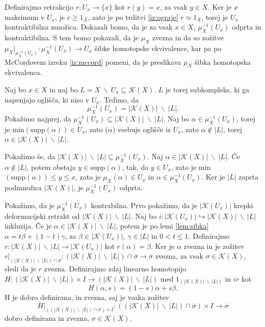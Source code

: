 \documentclass[mat1]{fmfdelo}
\DeclareRobustCommand{\k}{
    \mathcal{K}
}
\begin{document}
\begin{dokaz}
    Definirajmo retrakcijo $r:U_x\rightarrow \{x\}$ kot 
    $r(y)=x$, za vsak $y\in X$. Ker je $x$ maksimum v 
    $U_x$, je $r\geq 1_X$, zato je po trditvi 
    \ref{iz:ograje} $r\simeq 1_X$, torej je $U_x$ 
    kontraktibilna množica. Dokazali bomo, da je za vsak 
    $x\in X$, $\mu_X^{-1}(U_x)$ odprta in kontraktibilna. S 
    tem bomo pokazali, da je $\mu_X$ zvezna in da so 
    zožitve $\mu_X|_{\mu_X^{-1}(U_x)}:\mu_X^{-1}(U_x)\rightarrow 
    U_x$ šibke homotopske ekvivalence, kar pa po McCordovem izreku \ref*{iz:mccord}
    pomeni, da je preslikava $\mu_X$ šibka homotopska ekvivalenca.

    Naj bo $x\in X$ in naj bo $L=X\ \backslash \
    U_x\subseteq \mathcal{K}(X)$. $L$ je torej 
    subkompleks, ki ga napenjajo oglišča, ki niso v $U_x$. 
    Trdimo, da 
    $$
    \mu_X^{-1}(U_x)=|\mathcal{K}(X)|\ \backslash \ |L|.
    $$
    Pokažimo najprej, da $\mu_X^{-1}(U_x)\subseteq 
    |\mathcal{K}(X)|\ \backslash \ |L|$. Naj bo $\alpha \in 
    \mu_X^{-1}(U_x)$, torej je min$(
    (\alpha))\in U_x$, zato \text{supp}($\alpha$) vsebuje 
    oglišče iz $U_x$, zato $\alpha \notin |L|$, torej $\alpha 
    \in |\mathcal{K}(X)|\ \backslash \ |L|$.

    Pokažimo še, da $|\mathcal{K}(X)|\ \backslash \
    |L|\subseteq \mu_X^{-1}(U_x)$. Naj $\alpha \in |\mathcal{K}(X)|\ \backslash \ |L|.$
    Če  $\alpha \notin |L|$, potem obstaja $y\in 
    \text{supp}(\alpha)$, tak, da $y \in U_x$, zato je 
    min$(\text{supp}(\alpha))\leq y \leq x$, zato je 
    $\mu_X(\alpha) \in U_x$ in $\alpha \in \mu_X^{-1}
    (U_x)$.
    Ker je $|L|$ zaprta podmnožica $|\mathcal{K}(X)|$, je 
    $\mu_X^{-1}(U_x)$ odprta.

    Pokažimo, da je $\mu_X^{-1}(U_x)$ kontrabilna. Prvo pokažimo, da je 
    $|\mathcal{K}(U_x)|$ krepki deformacijski retrakt 
    od $|\mathcal{K}(X)|\ \backslash \ |L|$. Naj bo $i:|\k(U_x)|\hookrightarrow |\mathcal{K}
    (X)|\ \backslash \ |L|$ inkluzija. Če je $\alpha \in |\mathcal{K}(X)|\ 
    \backslash \ |L|$, potem je po lemi \ref{lem:sibka}  $\alpha = t\beta + 
    (1-t)\gamma$, za $\beta \in |\k(U_x)|, \ \gamma \in |L|$ in $0<t\leq 1$. 
    Definirajmo $r:|\mathcal{K}(X)|\ \backslash \ |L|\rightarrow |\k(U_x)|$ 
    kot $r(\alpha)=\beta$. Ker je $\alpha$ zvezna in je zožitev $r|_{(|\mathcal{K}(X)|\ \backslash \ |L|)\cap 
    \overline{\sigma}}:(|\mathcal{K}(X)|\ \backslash \ |L|)\cap 
    \overline{\sigma} \rightarrow \overline{\sigma}$ zvezna, za vsak 
    $\sigma \in \k(X)$, sledi da je $r$ zvezna. Definirajmo zdaj linearno homotopijo $H:(|\mathcal{K}(X)|\ \backslash \ |L|) \times I \rightarrow (|\mathcal{K}(X)|\ \backslash \ |L|)$ med $1_{(|\mathcal{K}(X)|\ \backslash \ |L|)}$ in $ir$ kot 
    $$
    H(\alpha,s)=(1-s)\alpha + s\beta.
    $$
    H je dobro definirana, in zvezna, saj je vsaka zožitev 
    $$
    H|_{((|\mathcal{K}(X)|\ \backslash \ |L|)\cap 
    \overline{\sigma})\times I}:((|\mathcal{K}(X)|\ \backslash \ |L|)\cap 
    \overline{\sigma})\times I \rightarrow \overline{\sigma}
    $$
    dobro definirana in zvezna, $\sigma \in \k(X)$.


\end{dokaz}
\end{document}
